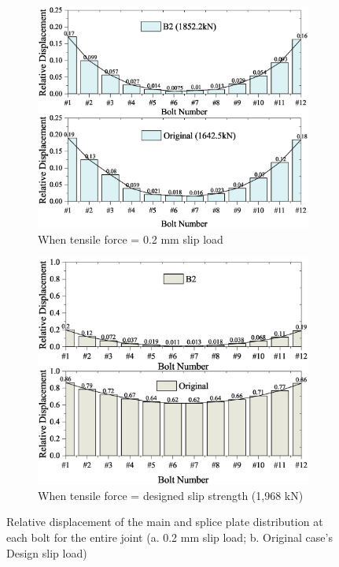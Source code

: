 \begin{figure}[htbp]
\centering
    \begin{subfigure}[t]{0.49\textwidth}
        \centering
        \includegraphics[width=\linewidth]{imgs/ch5/re-eabt-02.eps}
        \caption{When tensile force = 0.2 mm slip load}
        \label{fig-f02rdd}
    \end{subfigure}
    \hfill
    \begin{subfigure}[t]{0.49\textwidth}
        \centering
    \includegraphics[width=\linewidth]{imgs/ch5/re-eabt-ds.eps}
    \caption{When tensile force = designed slip strength (1,968 kN)}
    \label{fig-fdsrdd}
    \end{subfigure}
\caption{Relative  displacement of the main and splice plate distribution at each bolt for the entire joint (a. 0.2 mm slip load; b. Original case's Design slip load)}
\label{fig-rdd}
\end{figure}

